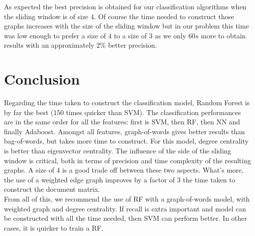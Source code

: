 \documentclass[11pt,a4paper]{article}
\begin{document}
As expected the best precision is obtained for our classification algorithms when the sliding window is of size $4$. Of course the time needed to construct those graphs increases with the size of the sliding window but in our problem this time was low enough to prefer a size of $4$ to a size of $3$ as we only $60s$ more to obtain results with an approximately $2\%$ better precision.

\section{Conclusion}
Regarding the time taken to construct the classification model, Random Forest is by far the best (150 times quicker than SVM). The classification performances are in the same order for all the features: first is SVM, then RF, then NN and finally Adaboost. Amongst all features, graph-of-words gives better results than bag-of-words, but takes more time to construct. For this model, degree centrality is better than eigenvector centrality. The influence of the side of the sliding window is critical, both in terms of precision and time complexity of the resulting graphs. A size of 4 is a good trade off between these two aspects. What's more, the use of a weighted edge graph improves by a factor of 3 the time taken to construct the document matrix.
\\From all of this, we recommend the use of RF with a graph-of-words model, with weighted graph and degree centrality. If recall is extra important and model can be constructed with all the time needed, then SVM can perform better. In other cases, it is quicker to train a RF.
\end{document}
